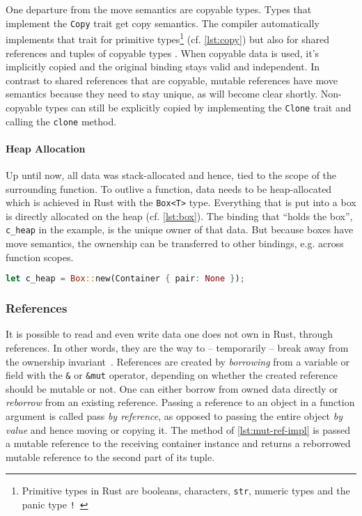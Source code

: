 One departure from the move semantics are copyable types. Types that implement
the \lstinline!Copy! trait get copy semantics. The compiler automatically
implements that trait for primitive types\footnote{Primitive types in Rust are
booleans, characters, \lstinline!str!, numeric types and the panic type
\texttt{!}~\cite{rustref}} (cf. \autoref{lst:copy}) but also for shared
references and tuples of copyable types \cite[section "Special types and
traits"]{rustref}. When copyable data is used, it's implicitly copied and the
original binding stays valid and independent. In contrast to shared references
that are copyable, mutable references have move semantics because they need to
stay unique, as will become clear shortly. Non-copyable types can still be
explicitly copied by implementing the \lstinline!Clone! trait and calling the
\lstinline!clone! method.

\paragraph{Heap Allocation}

Up until now, all data was stack-allocated and hence, tied to the scope of the
surrounding function. To outlive a function, data needs to be heap-allocated
which is achieved in Rust with the \lstinline!Box<T>! type. Everything that is
put into a box is directly allocated on the heap (cf. \autoref{lst:box}). The
binding that ``holds the box'', \lstinline!c_heap! in the example, is the unique
owner of that data. But because boxes have move semantics, the ownership can be
transferred to other bindings, e.g. across function scopes.

\begin{lstlisting}[language=Rust, label=lst:box, caption={A heap-allocated container.}, style=short]
let c_heap = Box::new(Container { pair: None });
\end{lstlisting}

\subsubsection{References}
\label{references}

It is possible to read and even write data one does not own in Rust, through
references. In other words, they are the way to -- temporarily -- break away
from the ownership invariant~\cite{lightweight-formalism}. References are
created by \emph{borrowing} from a variable or field with the \lstinline!&! or
\lstinline!&mut! operator, depending on whether the created reference should be
mutable or not. One can either borrow from owned data directly or
\emph{reborrow} from an existing reference. Passing a reference to an object in
a function argument is called pass \emph{by reference}, as opposed to passing
the entire object \emph{by value} and hence moving or copying it. The method of
\autoref{lst:mut-ref-impl} is passed a mutable reference to the receiving
container instance and returns a reborrowed mutable reference  to the second
part of its tuple.

